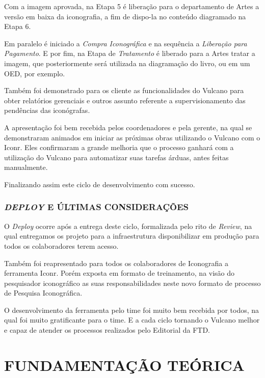 \documentclass[
  12pt,				%
  openany,
  oneside,
  a4paper,			%
  english,			%
  brazil
]{article}
\numberwithin{figure}{section}
\numberwithin{table}{section}
\begin{document}
Com a imagem aprovada, na Etapa 5 é liberação para o departamento de Artes a versão em baixa da iconografia, a fim de dispo-la no conteúdo diagramado na Etapa 6. 

Em paralelo é iniciado a \textit{Compra Iconográfica} e na sequência a \textit{Liberação para Pagamento}. E por fim, na Etapa de \textit{Tratamento} é liberado para a Artes tratar a imagem, que posteriormente será utilizada na diagramação do livro, ou em um OED, por exemplo.

Também foi demonstrado para os cliente as funcionalidades do Vulcano para obter relatórios gerenciais e outros assunto referente a supervisionamento das pendências das iconógrafas.

A apresentação foi bem recebida pelos coordenadores e pela gerente, na qual se demonstraram animados em iniciar as próximas obras utilizando o Vulcano com o Iconr. Eles confirmaram a grande melhoria que o processo ganhará com a utilização do Vulcano para automatizar suas tarefas árduas, antes feitas manualmente.

Finalizando assim este ciclo de desenvolvimento com sucesso.


\subsubsection{\textit{DEPLOY} E ÚLTIMAS CONSIDERAÇÕES}

O \textit{Deploy} ocorre após a entrega deste ciclo, formalizada pelo rito de \textit{Review}, na qual entregamos os projeto para a infraestrutura disponibilizar em produção para todos os colaboradores terem acesso.

Também foi reapresentado para todos os colaboradores de Iconografia a ferramenta Iconr. Porém exposta em formato de treinamento, na visão do pesquisador iconográfico as suas responsabilidades neste novo formato de processo de Pesquisa Iconográfica.

O desenvolvimento da ferramenta pelo time foi muito bem recebida por todos, na qual foi muito gratificante para o time. E a cada ciclo tornando o Vulcano melhor e capaz de atender os processos realizados pelo Editorial da FTD.




\clearpage
\section{FUNDAMENTAÇÃO TEÓRICA}

\end{document}
